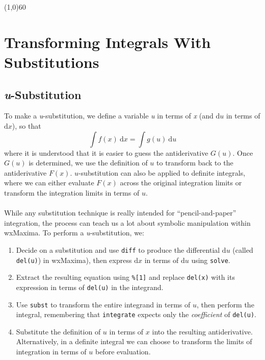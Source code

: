 \documentclass[10.5pt,twoside]{report}
\theoremstyle{definition}
\begin{document}
\line(1,0){60}
\linethickness{0.5mm}
\pagebreak



\pagebreak
\section{Transforming Integrals With Substitutions}\label{Transforming Integrals With Substitutions}

\subsection{\textit{u}-Substitution}

To make a \textit{u}-substitution, we define a variable \textit{u} in terms of \textit{x} (and $\mathrm{d}u$ in terms of $\mathrm{d}x$), so that 
$$\int f(x)\ \mathrm{d}x=\int g(u)\ \mathrm{d}u$$
where it is understood that it is easier to guess the antiderivative $G(u)$.  Once $G(u)$ is determined, we use the definition of $u$ to transform back to the antiderivative $F(x)$.  $u$-substitution can also be applied to definite integrals, where we can either evaluate $F(x)$ across the original integration limits or transform the integration limits in terms of $u$.\\
${}$\\

While any substitution technique is really intended for ``pencil-and-paper'' integration, the process can teach us a lot about symbolic manipulation within wxMaxima.  To perform a \textit{u}-substitution, we:

\begin{enumerate}

\item Decide on a substitution and use \verb|diff| to produce the differential $\mathrm{d}u$ (called \verb|del(u)|) in wxMaxima), then express $\mathrm{d}x$ in terms of $\mathrm{d}u$ using \verb|solve|. 

\item Extract the resulting equation  using \verb|%[1]| and replace \verb|del(x)| with its expression in terms of \verb|del(u)| in the integrand.

\item Use \verb|subst| to transform the entire integrand in terms of $u$, then perform the integral, remembering that \verb|integrate| expects only the \textit{coefficient} of \verb|del(u)|.

\item Substitute the definition of $u$ in terms of $x$ into the resulting antiderivative.  Alternatively, in a  definite integral we can choose to transform the limits of integration in terms of $u$ before evaluation.

\end{enumerate}
\end{document}
